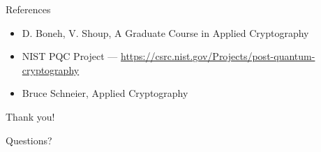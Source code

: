 \documentclass{beamer}
\begin{document}
\begin{frame}{References}
\begin{itemize}
\item D. Boneh, V. Shoup, A Graduate Course in Applied Cryptography
\item NIST PQC Project — \url{https://csrc.nist.gov/Projects/post-quantum-cryptography}
\item Bruce Schneier, Applied Cryptography
\end{itemize}
\end{frame}

\begin{frame}{Thank you!}
\begin{center}
Questions?

\vspace{2em}
\end{center}
\end{frame}
\end{document}
